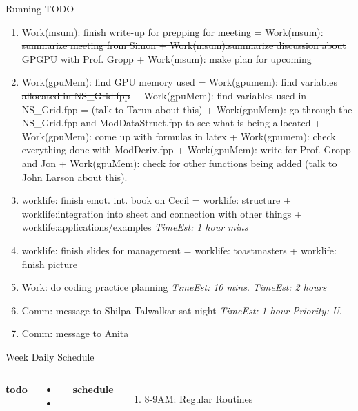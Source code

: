 \documentclass[serif, mathserif, final]{beamer}
\newcommand{\doneTaskNoItem}[1]{\sout{#1}}
\newcommand{\doneTask}[1]{\tiny \item \tiny \sout{#1}}
\newcommand{\te}[1]{\textit{TimeEst:} \textit{#1}}
\newcommand{\prio}[1]{\textit{Priority:} \textit{#1}}
\newcommand{\dl}[1]{#1}
\begin{document}
\begin{frame}
\begin{columns}
\begin{column}{0.50\linewidth}
\begin{block}{Running TODO}
\begin{enumerate}
\doneTask{Work(msum): finish write-up for prepping for meeting =
  Work(msum): summarize meeting from Simon + Work(msum):summarize
  discussion about GPGPU with Prof. Gropp + Work(msum): make plan for
  upcoming} 

\item \small Work(gpuMem): find GPU memory used  = \doneTaskNoItem{ Work(gpumem): find
  variables allocated in NS\_Grid.fpp} + Work(gpuMem): find variables
  used in NS\_Grid.fpp = (talk to Tarun about this) + Work(gpuMem): go through the NS\_Grid.fpp and ModDataStruct.fpp
  to see what is being allocated + Work(gpuMem): come up with formulas in
  latex + Work(gpumem): check everything done with ModDeriv.fpp +
  Work(gpuMem): write for Prof. Gropp and Jon  + Work(gpuMem): check
  for other functions being added (talk to John Larson about this). 

\item \small worklife: finish emot. int. book  on Cecil =
  worklife: structure + worklife:integration into sheet and
  connection with other things + worklife:applications/examples \te{1 hour mins} 
  
\item \small worklife: finish slides for management =
  worklife: toastmasters + worklife: finish picture 
  
\item \small Work: do coding practice planning \te{10 mins}. \te{2 hours} 
  
\item \small Comm: message to Shilpa Talwalkar \dl{sat night}
  \te{1 hour} \prio{U}.
\item \small Comm: message to Anita
  
        \end{enumerate}
      \end{block} 
      
      \begin{block}{Week Daily Schedule} 
        \begin{columns} 
          \textbf{\small todo} \\ 
          \begin{itemize}
            \tiny \item \tiny 
          \item \tiny 
          \end{itemize} 
          \textbf{\small schedule} \\
          \begin{enumerate} 
            \tiny \item \tiny 8-9AM: Regular Routines 
          \end{enumerate} 


\end{columns}
\end{block}
\end{column}
\end{columns}
\end{frame}
\end{document}

